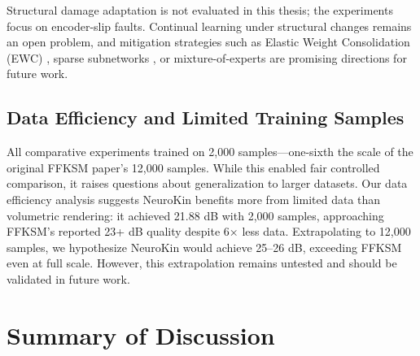 \documentclass[12pt,a4paper,oneside]{report}
\begin{document}
Structural damage adaptation is not evaluated in this thesis; the experiments focus on encoder-slip faults. Continual learning under structural changes remains an open problem, and mitigation strategies such as Elastic Weight Consolidation (EWC) \cite{kirkpatrick2017overcoming}, sparse subnetworks \cite{frankle2018lottery}, or mixture-of-experts \cite{mocanu2018scalable} are promising directions for future work.

\subsection{Data Efficiency and Limited Training Samples}
\label{subsec:data_efficiency_and_limited_training_samples}

All comparative experiments trained on 2,000 samples—one-sixth the scale of the original FFKSM paper's 12,000 samples. While this enabled fair controlled comparison, it raises questions about generalization to larger datasets. Our data efficiency analysis suggests NeuroKin benefits more from limited data than volumetric rendering: it achieved 21.88 dB with 2,000 samples, approaching FFKSM's reported 23+ dB quality despite 6× less data. Extrapolating to 12,000 samples, we hypothesize NeuroKin would achieve 25–26 dB, exceeding FFKSM even at full scale. However, this extrapolation remains untested and should be validated in future work.

\section{Summary of Discussion}
\end{document}
